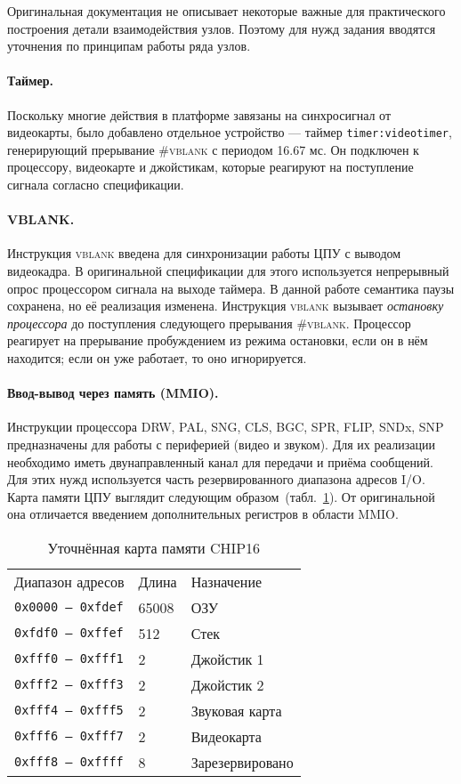 Оригинальная документация не описывает некоторые важные для практического построения детали взаимодействия узлов. Поэтому для нужд задания вводятся уточнения по принципам работы ряда узлов.

\paragraph{Таймер.} Поскольку многие действия в платформе завязаны на синхросигнал от видеокарты, было добавлено отдельное устройство --- таймер \texttt{timer:videotimer}, генерирующий прерывание \textsc{\#vblank} с периодом 16.67 мс. Он подключен к процессору, видеокарте и джойстикам, которые реагируют на поступление сигнала согласно спецификации.

\paragraph{VBLANK.} Инструкция \textsc{vblank} введена для синхронизации работы ЦПУ с выводом видеокадра. В оригинальной спецификации для этого используется непрерывный опрос процессором сигнала на выходе таймера. В данной работе семантика паузы сохранена, но её реализация изменена. Инструкция \textsc{vblank} вызывает \textit{остановку процессора} до поступления следующего прерывания \textsc{\#vblank}. Процессор реагирует на прерывание пробуждением из режима остановки, если он в нём находится; если он уже работает, то оно игнорируется.

\paragraph{Ввод-вывод через память (MMIO).} Инструкции процессора DRW, PAL, SNG, CLS, BGC, SPR, FLIP, SNDx, SNP предназначены для работы с периферией (видео и звуком). Для их реализации необходимо иметь двунаправленный канал для передачи и приёма сообщений. Для этих нужд используется часть резервированного диапазона адресов I/O. Карта памяти ЦПУ выглядит следующим образом~(табл.~\ref{tab:memmap}). От оригинальной она отличается введением дополнительных регистров в области MMIO.

\begin{table}[htb]
\begin{tabular}{lll}
Диапазон адресов         & Длина & Назначение \\
\texttt{0x0000 -- 0xfdef}& 65008 & ОЗУ        \\
\texttt{0xfdf0 -- 0xffef}& 512   & Стек       \\
\texttt{0xfff0 -- 0xfff1}& 2     & Джойстик 1 \\
\texttt{0xfff2 -- 0xfff3}& 2     & Джойстик 2 \\
\texttt{0xfff4 -- 0xfff5}& 2     & Звуковая карта \\
\texttt{0xfff6 -- 0xfff7}& 2     & Видеокарта \\
\texttt{0xfff8 -- 0xffff}& 8     & Зарезервировано \\
\end{tabular}
\caption{Уточнённая карта памяти CHIP16}
\label{tab:memmap}
\end{table} 

